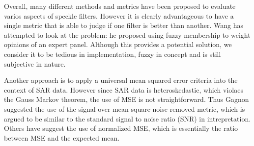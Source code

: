 \documentclass[journal]{IEEEtran}
\begin{document}
Overall, many different methods and metrics have been proposed to evaluate varios aspects of speckle filters. 
However it is clearly advantageous to have a single metric that is able to judge if one filter is better than another. 
Wang \cite{Wang_2005_MIPR} has attempted to look at the problem: he proposed using fuzzy membership to weight opinions of an expert panel. 
Although this provides a potential solution, we consider it to be tedious in implementation, fuzzy in concept and is still subjective in nature.


Another approach is to apply a universal mean squared error criteria into the context of SAR data. 
However since SAR data is heteroskedastic, which violaes the Gauss Markov theorem, the use of MSE is not straightforward. 
Thus Gagnon \cite{Gagnon_SPIEProc_1997} suggested the use of the signal over mean square noise removed metric, which is argued to be similar to the standard signal to noise ratio (SNR) in intrepretation. Others have suggest the use of normalized MSE, which is essentially the ratio between MSE and the expected mean.

\end{document}
